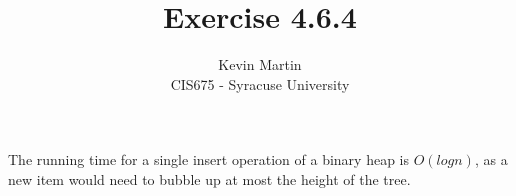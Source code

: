 \documentclass{article}
\author{Kevin Martin\\ CIS675 - Syracuse University}
\title{Exercise 4.6.4}
\begin{document}
\maketitle
The running time for a single insert operation of a binary heap is
$O(log n)$, as a new item would need to bubble up at most the height
of the tree.
\end{document}
